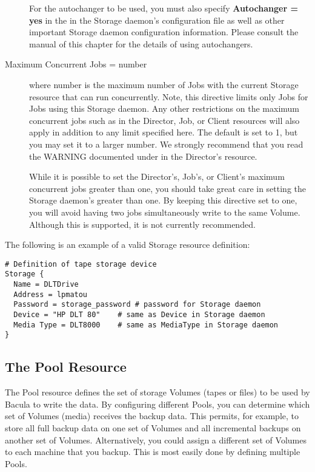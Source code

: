 \begin{description}
For the autochanger to be  used, you must also specify {\bf Autochanger = yes}
in the  
  in the Storage daemon's
configuration file as well as other  important Storage daemon configuration
information.  Please consult the 
 manual of this
chapter for the details of  using autochangers. 

\item [Maximum Concurrent Jobs = \lt{}number\gt{}]
   where \lt{}number\gt{}  is the maximum number of Jobs with the current Storage
resource that  can run concurrently. Note, this directive limits only Jobs 
for Jobs using this Storage daemon. Any  other restrictions on the maximum
concurrent jobs such as in  the Director, Job, or Client resources will also
apply in addition to  any limit specified here. The  default is set to 1, but
you may set it to a larger number.  We strongly recommend that you read the
WARNING documented under  
 in the Director's
resource.  

While it is possible to set the Director's, Job's, or Client's  maximum
concurrent jobs greater than one, you should take great  care in setting the
Storage daemon's greater than one. By keeping  this directive set to one, you
will avoid having two jobs simultaneously  write to the same Volume. Although
this is supported, it is not  currently recommended.  
\end{description}

The following is an example of a valid Storage resource definition: 

\footnotesize
\begin{verbatim}
# Definition of tape storage device
Storage {
  Name = DLTDrive
  Address = lpmatou
  Password = storage_password # password for Storage daemon
  Device = "HP DLT 80"    # same as Device in Storage daemon
  Media Type = DLT8000    # same as MediaType in Storage daemon
}
\end{verbatim}
\normalsize

\subsection*{The Pool Resource}
\label{PoolResource}

The Pool resource defines the set of storage Volumes (tapes or files) to be
used by Bacula to write the data. By configuring different Pools, you can
determine which set of Volumes (media) receives the backup data. This permits,
for example, to store all full backup data on one set of Volumes and all
incremental backups on another set of Volumes. Alternatively, you could assign
a different set of Volumes to each machine that you backup. This is most
easily done by defining multiple Pools. 

